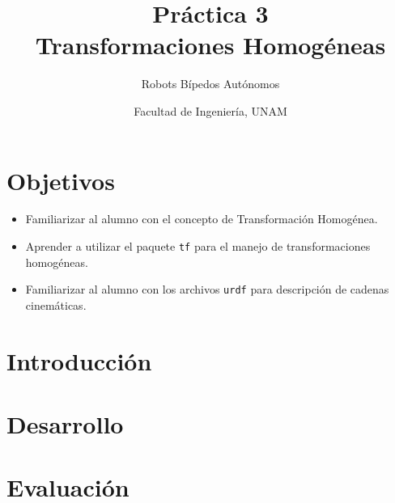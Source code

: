 \documentclass[letterpaper,12pt]{article}
\title{Práctica 3 \\ Transformaciones Homogéneas}
\author{Robots Bípedos Autónomos}
\date{Facultad de Ingeniería, UNAM}
\begin{document}
\renewcommand{\tablename}{Tabla}
\maketitle
\section*{Objetivos}
\begin{itemize}
\item Familiarizar al alumno con el concepto de Transformación Homogénea.
\item Aprender a utilizar el paquete \texttt{tf} para el manejo de transformaciones homogéneas.
\item Familiarizar al alumno con los archivos \texttt{urdf} para descripción de cadenas cinemáticas.
\end{itemize}

\section{Introducción}

\section{Desarrollo}

\section{Evaluación}
\end{document}
